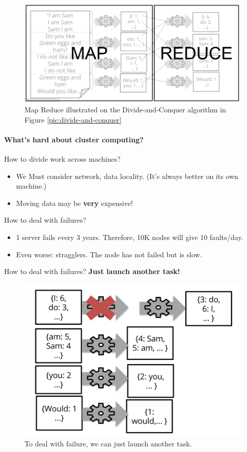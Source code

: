 \begin{figure}[H]%
 \centering
 \includegraphics[width=13cm]{./img/10/map-reduce}
 \caption{\label{pic:map-reduce} Map Reduce illustrated on the Divide-and-Conquer algorithm in Figure \ref{pic:divide-and-conquer}}
\end{figure}

\paragraph{What's hard about cluster computing?}

How to divide work across machines?
\begin{itemize}
 \item We Must consider network, data locality. (It's always better on its own machine.)
 \item Moving data may be {\bf very} expensive!
\end{itemize}

How to deal with failures?
\begin{itemize}
 \item 1 server fails every 3 years. Therefore, 10K nodes will give 10 faults/day.
 \item Even worse: stragglers. The node has not failed but is slow.
\end{itemize}

How to deal with failures? {\bf Just launch another task!}

\begin{figure}[H]%
 \centering
 \includegraphics[width=13cm]{./img/10/failure}
 \caption{\label{pic:failure} To deal with failure, we can just launch another task.}
\end{figure}

